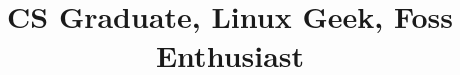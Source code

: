\documentclass[10pt, a4paper]{moderncv}
\title{CS Graduate, Linux Geek, Foss Enthusiast}
\begin{document}
\maketitle
\\
\\


\\
\\
\\
\\
\end{document}
